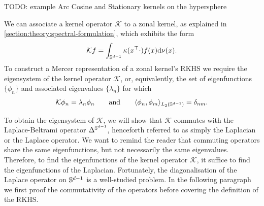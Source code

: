 TODO: example Arc Cosine and Stationary kernels on the hypersphere


We can associate a kernel operator $\mathcal{K}$ to a zonal kernel, as explained in \cref{section:theory:spectral-formulation}, which exhibits the form
\begin{equation}
    \label{eq:kernel-operator-zonal}
  \mathcal{K} f = \int_{\mathbb{S}^{d-1}} \kappa(x^{\top}\cdot) f(x) \mathrm{d}{\nu(x)}.
\end{equation}
To construct a Mercer representation of a zonal kernel's RKHS we require the eigensystem of the kernel operator $\mathcal{K}$, or, equivalently, the set of eigenfunctions $\{\phi_n\}$ and associated eigenvalues $\{\lambda_n\}$ for which
\begin{equation}
    \mathcal{K} \phi_n = \lambda_n \phi_n\qquad\text{and}\qquad \langle \phi_n, \phi_m \rangle_{L_2(\mathbb{S}^{d-1})} = \delta_{nm}.
\end{equation}

To obtain the eigensystem of $\mathcal{K}$, we will show that $\mathcal{K}$ commutes with the Laplace-Beltrami operator $\Delta^{\mathbb{S}^{d-1}}$, henceforth referred to as simply the Laplacian or the Laplace operator. We want to remind the reader that commuting operators share the same eigenfunctions, but not necessarily the same eigenvalues. Therefore, to find the eigenfunctions of the kernel operator $\mathcal{K}$, it suffice to find the eigenfunctions of the Laplacian. Fortunately, the diagonalisation of the Laplace operator on $\mathbb{S}^{d-1}$ is a well-studied problem. In the following paragraph we first proof the commutativity of the operators before covering the definition of the RKHS.

